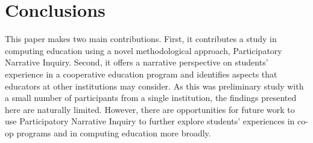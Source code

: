 \documentclass{article}
\begin{document}
\section{Conclusions}
This paper makes two main contributions. First, it contributes a study in computing education using a novel methodological approach, Participatory Narrative Inquiry. Second, it offers a narrative perspective on students’ experience in a cooperative education program and identifies aspects that educators at other institutions may consider. As this was preliminary study with a small number of participants from a single institution, the findings presented here are naturally limited. However, there are opportunities for future work to use Participatory Narrative Inquiry to further explore students’ experiences in co-op programs and in computing education more broadly.


\medskip

\printbibliography
\end{document}

